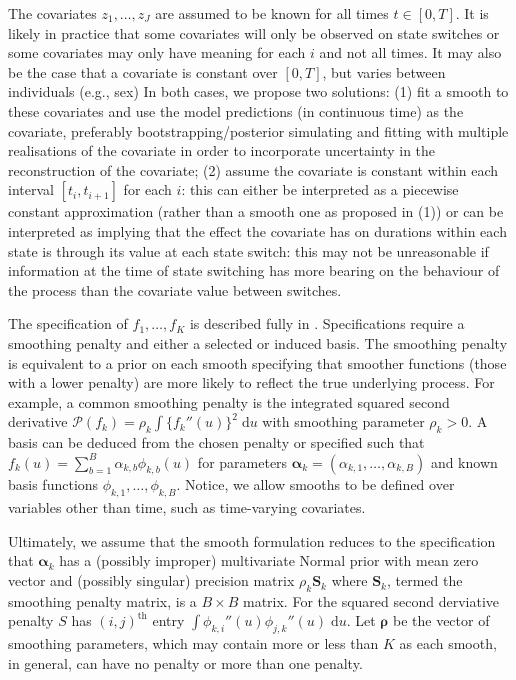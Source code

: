 \documentclass[referee]{rgclass}
\begin{document}
The covariates $z_1, \ldots, z_J$ are assumed to be known for all times $t \in [0,T]$. It is likely in practice that some covariates will only be observed on state switches or some covariates may only have meaning for each $i$ and not all times. It may also be the case that a covariate is constant over $[0,T]$, but varies between individuals (e.g., sex) In both cases, we propose two solutions: (1) fit a smooth to these covariates and use the model predictions (in continuous time) as the covariate, preferably bootstrapping/posterior simulating and fitting with multiple realisations of the covariate in order to incorporate uncertainty in the reconstruction of the covariate; (2) assume the covariate is constant within each interval $[t_i, t_{i + 1}]$ for each $i$: this can either be interpreted as a piecewise constant approximation (rather than a smooth one as proposed in (1)) or can be interpreted as implying that the effect the covariate has on durations within each state is through its value at each state switch: this may not be unreasonable if information at the time of state switching has more bearing on the behaviour of the process than the covariate value between switches.  

The specification of $f_1, \ldots, f_K$ is described fully in \citet{wood2017generalized}. Specifications require a smoothing penalty and either a selected or induced basis. The smoothing penalty is equivalent to a prior on each smooth specifying that smoother functions (those with a lower penalty) are more likely to reflect the true underlying process. For example, a common smoothing penalty is the integrated squared second derivative $\mathcal{P}(f_k) = \rho_k\int \{f_k''(u)\}^2 \;\mathrm{d}u$ with smoothing parameter $\rho_k > 0$. A basis can be deduced from the chosen penalty or specified such that $f_k(u) = \sum_{b = 1}^B \alpha_{k,b}\phi_{k,b}(u)$ for parameters $\bm\alpha_k = (\alpha_{k,1}, \ldots, \alpha_{k,B})$ and known basis functions $\phi_{k,1}, \ldots, \phi_{k,B}$. Notice, we allow smooths to be defined over variables other than time, such as time-varying covariates. 

Ultimately, we assume that the smooth formulation reduces to the specification that $\bm{\alpha}_k$ has a (possibly improper) multivariate Normal prior with mean zero vector and (possibly singular) precision matrix $\rho_k\bm{S}_k$ where $\bm{S}_k$, termed the smoothing penalty matrix, is a $B \times B$ matrix. For the squared second derviative penalty $S$ has $(i,j)^{\text{th}}$ entry $\int \phi_{k,i}''(u)\phi_{j,k}''(u)\;\mathrm{d}u$. Let $\bm\rho$ be the vector of smoothing parameters, which may contain more or less than $K$ as each smooth, in general, can have no penalty or more than one penalty. 
\end{document}
